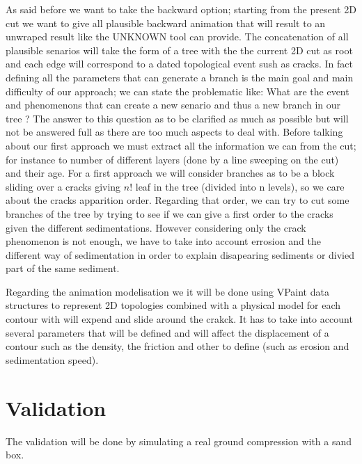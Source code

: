 \documentclass[a4paper,11pt]{article}
\begin{document}
As said before we want to take the backward option; starting from the present 2D cut we want to give all plausible backward animation that will result to an unwraped result like the UNKNOWN tool can provide. 
The concatenation of all plausible senarios will take the form of a tree with the the current 2D cut as root and each edge will correspond to a dated topological event sush as cracks. In fact defining all the parameters that can generate a branch is the main goal and main difficulty of our approach; we can state the problematic like: What are the event and phenomenons that can create a new senario and thus a new branch in our tree ?
The answer to this question as to be clarified as much as possible but will not be answered full as there are too much aspects to deal with. 
Before talking about our first approach we must extract all the information we can from the cut; for instance to number of different layers (done by a line sweeping on the cut) and their age.
For a first approach we will consider branches as to be a block sliding over a cracks giving $n!$ leaf in the tree (divided into n levels), so we care about the cracks apparition order. Regarding that order, we can try to cut some branches of the tree by  trying to see if we can give a first order to the cracks given the different sedimentations.
However considering only the crack phenomenon is not enough, we have to take into account errosion and the different way of sedimentation in order to explain disapearing sediments or divied part of the same sediment.

Regarding the animation modelisation we it will be done using VPaint data structures to represent 2D topologies combined with a physical model for each contour with will expend and slide around the crakck.
It has to take into account several parameters that will be defined and will affect the displacement of a contour such as the density, the friction and other to define (such as erosion and sedimentation speed).

\section{Validation}

The validation will be done by simulating a real ground compression with a sand box.
\end{document}
